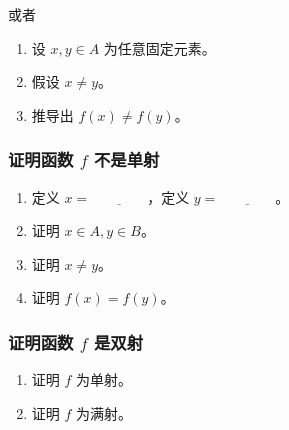 或者

\begin{enumerate}
    \item 设 $x,y \in A$ 为任意固定元素。
    \item 假设 $x \ne y$。
    \item 推导出 $f(x) \ne f(y)$。
\end{enumerate}

\subsubsection*{证明函数 $f$ 不是单射}

\begin{enumerate}
    \item 定义 $x = \underline{\qquad\qquad}$，定义 $y = \underline{\qquad\qquad}$。
    \item 证明 $x \in A, y \in B$。
    \item 证明 $x \ne y$。
    \item 证明 $f(x) = f(y)$。
\end{enumerate}

\subsubsection*{证明函数 $f$ 是双射}

\begin{enumerate}
    \item 证明 $f$ 为单射。
    \item 证明 $f$ 为满射。
\end{enumerate}